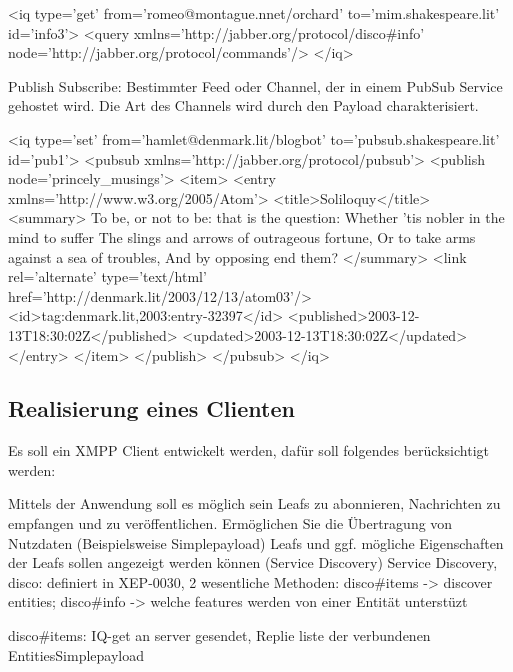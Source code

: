 <iq type='get'
    from='romeo@montague.nnet/orchard'
    to='mim.shakespeare.lit'
    id='info3'>
  <query xmlns='http://jabber.org/protocol/disco\#info'
         node='http://jabber.org/protocol/commands'/>
</iq>



Publish Subscribe: Bestimmter Feed oder Channel, der in einem PubSub Service gehostet wird. Die Art des Channels wird durch den Payload charakterisiert.


<iq type='set'
    from='hamlet@denmark.lit/blogbot'
    to='pubsub.shakespeare.lit'
    id='pub1'>
  <pubsub xmlns='http://jabber.org/protocol/pubsub'>
    <publish node='princely\_musings'>
      <item>
        <entry xmlns='http://www.w3.org/2005/Atom'>
          <title>Soliloquy</title>
          <summary>
To be, or not to be: that is the question:
Whether 'tis nobler in the mind to suffer
The slings and arrows of outrageous fortune,
Or to take arms against a sea of troubles,
And by opposing end them?
          </summary>
          <link rel='alternate' type='text/html'
                href='http://denmark.lit/2003/12/13/atom03'/>
          <id>tag:denmark.lit,2003:entry-32397</id>
          <published>2003-12-13T18:30:02Z</published>
          <updated>2003-12-13T18:30:02Z</updated>
        </entry>
      </item>
    </publish>
  </pubsub>
</iq>



\newpage

\subsection{Realisierung eines Clienten}

Es soll ein XMPP Client entwickelt werden, dafür soll folgendes berücksichtigt werden:

Mittels der Anwendung soll es möglich sein Leafs zu abonnieren, Nachrichten zu empfangen und zu veröffentlichen.
Ermöglichen Sie die Übertragung von Nutzdaten (Beispielsweise Simplepayload)
Leafs und ggf. mögliche Eigenschaften der Leafs sollen angezeigt werden können (Service Discovery)
Service Discovery, disco: definiert in XEP-0030,
2 wesentliche Methoden: disco\#items -> discover entities; disco\#info -> welche features werden von einer Entität unterstüzt

disco\#items: IQ-get an server gesendet, Replie liste der verbundenen EntitiesSimplepayload
